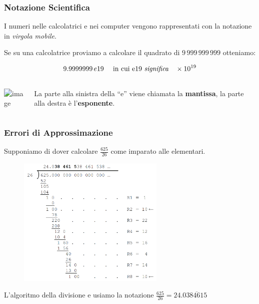 \documentclass[xcolor={table}]{beamer}
\begin{document}
\begin{frame}
   \frametitle{Notazione Scientifica}
   
   I numeri nelle calcolatrici e nei computer vengono rappresentati con la notazione in {\it virgola mobile}.
   
   \bigskip
   Se su una calcolatrice proviamo a calcolare il quadrato di $9\,999\,999\,999$ otteniamo:
   
   $$9.9999999\,e19 \quad \mbox { in cui e19 {\it significa}} \quad \times 10^{19}$$

      \bigskip   

   \begin{columns}
	\begin{column}{0.5\textwidth}
   {\centering \includegraphics<1->[width=4cm]{img/sciNotation}}
   \end{column}
	\begin{column}{0.5\textwidth}  %
   La parte alla sinistra della ``e'' viene chiamata la {\bf mantissa}, la parte alla destra è l'{\bf esponente}.
   \end{column}
	\end{columns}
\end{frame}

\begin{frame}
   \frametitle{Errori di Approssimazione}
   
	Supponiamo di dover calcolare $\frac{625}{26}$ come imparato alle elementari.
	\begin{figure}[h]
	\begin{center}
	\includegraphics[width=7cm]{img/binary1.PNG}
	\end{center}
	\end{figure}
	
	\pause
	L'algoritmo della divisione e usiamo la notazione $\frac{625}{26} = 24.0\overline{384615}$
\end{frame}
\end{document}
